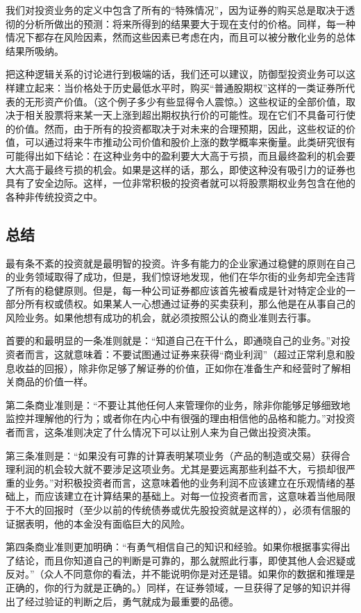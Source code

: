 \documentclass[12pt,oneside]{book}
\begin{document}
我们对投资业务的定义中包含了所有的“特殊情况”，因为证券的购买总是取决于透彻的分析所做出的预测：将来所得到的结果要大于现在支付的价格。同样，每一种情况下都存在风险因素，然而这些因素已考虑在内，而且可以被分散化业务的总体结果所吸纳。

把这种逻辑关系的讨论进行到极端的话，我们还可以建议，防御型投资业务可以这样建立起来：当价格处于历史最低水平时，购买“普通股期权”这样的一类证券所代表的无形资产价值。（这个例子多少有些显得令人震惊。）这些权证的全部价值，取决于相关股票将来某一天上涨到超出期权执行价的可能性。现在它们不具备可行使的价值。然而，由于所有的投资都取决于对未来的合理预期，因此，这些权证的价值，可以通过将来牛市推动公司价值和股价上涨的数学概率来衡量。此类研究很有可能得出如下结论：在这种业务中的盈利要大大高于亏损，而且最终盈利的机会要大大高于最终亏损的机会。如果是这样的话，那么，即使这种没有吸引力的证券也具有了安全边际。这样，一位非常积极的投资者就可以将股票期权业务包含在他的各种非传统投资之中。

\subsection{总结}
最有条不紊的投资就是最明智的投资。许多有能力的企业家通过稳健的原则在自己的业务领域取得了成功，但是，我们惊讶地发现，他们在华尔街的业务却完全违背了所有的稳健原则。但是，每一种公司证券都应该首先被看成是针对特定企业的一部分所有权或债权。如果某人一心想通过证券的买卖获利，那么他是在从事自己的风险业务。如果他想有成功的机会，就必须按照公认的商业准则去行事。

首要的和最明显的一条准则就是：“知道自己在干什么，即通晓自己的业务。”对投资者而言，这就意味着：不要试图通过证券来获得“商业利润”（超过正常利息和股息收益的回报），除非你足够了解证券的价值，正如你在准备生产和经营时了解相关商品的价值一样。

第二条商业准则是：“不要让其他任何人来管理你的业务，除非你能够足够细致地监控并理解他的行为；或者你在内心中有很强的理由相信他的品格和能力。”对投资者而言，这条准则决定了什么情况下可以让别人来为自己做出投资决策。

第三条准则是：“如果没有可靠的计算表明某项业务（产品的制造或交易）获得合理利润的机会较大就不要涉足这项业务。尤其是要远离那些利益不大，亏损却很严重的业务。”对积极投资者而言，这意味着他的业务利润不应该建立在乐观情绪的基础上，而应该建立在计算结果的基础上。对每一位投资者而言，这意味着当他局限于不大的回报时（至少以前的传统债券或优先股投资就是这样的），必须有信服的证据表明，他的本金没有面临巨大的风险。

第四条商业准则更加明确：“有勇气相信自己的知识和经验。如果你根据事实得出了结论，而且你知道自己的判断是可靠的，那么就照此行事，即使其他人会迟疑或反对。”（众人不同意你的看法，并不能说明你是对还是错。如果你的数据和推理是正确的，你的行为就是正确的。）同样，在证券领域，一旦获得了足够的知识并得出了经过验证的判断之后，勇气就成为最重要的品德。
\end{document}
